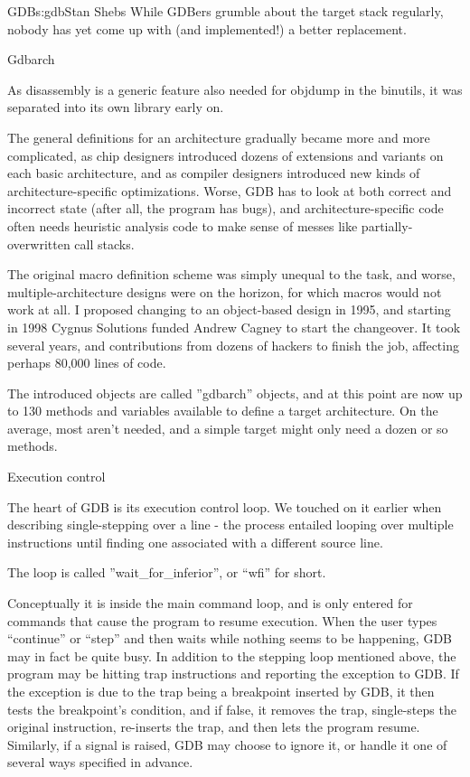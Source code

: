 \begin{aosachapter}{GDB}{s:gdb}{Stan Shebs}
While GDBers grumble about the target stack regularly, nobody has yet
come up with (and implemented!) a better replacement.

Gdbarch

As disassembly is a generic feature also needed for objdump in the
binutils, it was separated into its own library early on.

The general definitions for an architecture gradually became more and
more complicated, as chip designers introduced dozens of extensions
and variants on each basic architecture, and as compiler designers
introduced new kinds of architecture-specific optimizations.  Worse,
GDB has to look at both correct and incorrect state (after all, the
program has bugs), and architecture-specific code often needs
heuristic analysis code to make sense of messes like
partially-overwritten call stacks.

The original macro definition scheme was simply unequal to the task,
and worse, multiple-architecture designs were on the horizon, for
which macros would not work at all.  I proposed changing to an
object-based design in 1995, and starting in 1998 Cygnus Solutions
funded Andrew Cagney to start the changeover.  It took several years,
and contributions from dozens of hackers to finish the job, affecting
perhaps 80,000 lines of code.

The introduced objects are called ''gdbarch'' objects, and at this
point are now up to 130 methods and variables available to define a
target architecture.  On the average, most aren't needed, and a
simple target might only need a dozen or so methods.

Execution control

The heart of GDB is its execution control loop.  We touched on it earlier
when describing single-stepping over a line - the process entailed looping
over multiple instructions until finding one associated with a different
source line.

The loop is called ''wait\_for\_inferior'', or ``wfi'' for short.

Conceptually it is inside the main command loop, and is only entered for
commands that cause the program to resume execution.  When the user types
``continue'' or ``step'' and then waits while nothing seems to be happening,
GDB may in fact be quite busy.  In addition to the stepping loop mentioned
above, the program may be hitting trap instructions and reporting the exception
to GDB.  If the exception is due to the trap being a breakpoint inserted by
GDB, it then tests the breakpoint's condition, and if false, it removes the
trap, single-steps the original instruction, re-inserts the trap, and then
lets the program resume.  Similarly, if a signal is raised, GDB may choose
to ignore it, or handle it one of several ways specified in advance.


\end{aosachapter}
